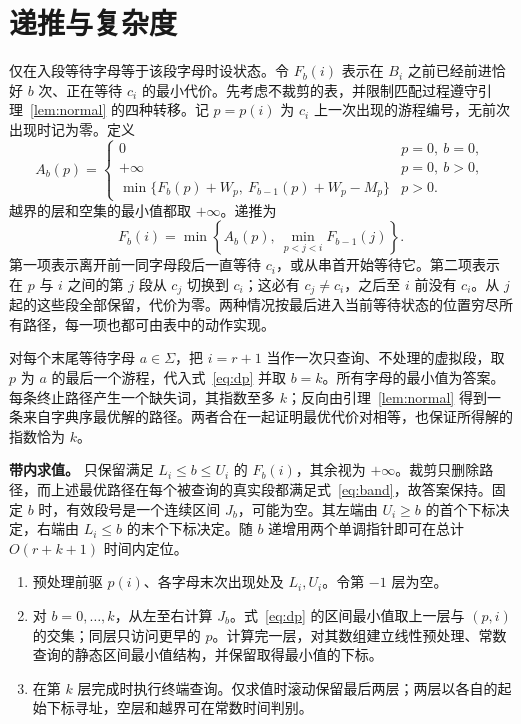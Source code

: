 \documentclass[UTF8,11pt,a4paper,fontset=fandol]{ctexart}
\theoremstyle{zh}
\newcommand{\sig}{\Sigma}
\newcommand{\pagehead}[1]{\clearpage\section{#1}}
\begin{document}
\pagehead{递推与复杂度}
仅在入段等待字母等于该段字母时设状态。令 $F_b(i)$ 表示在 $B_i$ 之前已经前进恰好 $b$ 次、正在等待 $c_i$ 的最小代价。先考虑不裁剪的表，并限制匹配过程遵守引理~\ref{lem:normal} 的四种转移。记 $p=p(i)$ 为 $c_i$ 上一次出现的游程编号，无前次出现时记为零。定义
\[
 A_b(p)=
 \begin{cases}
  0 & p=0,\ b=0,\\
  +\infty & p=0,\ b>0,\\
  \min\{F_b(p)+W_p,\ F_{b-1}(p)+W_p-M_p\} & p>0 .
 \end{cases}
\]
越界的层和空集的最小值都取 $+\infty$。递推为
\begin{equation}
 F_b(i)=\min\left\{ A_b(p),\ \min_{p<j<i}F_{b-1}(j)\right\}.
 \label{eq:dp}
\end{equation}
第一项表示离开前一同字母段后一直等待 $c_i$，或从串首开始等待它。第二项表示在 $p$ 与 $i$ 之间的第 $j$ 段从 $c_j$ 切换到 $c_i$；这必有 $c_j\ne c_i$，之后至 $i$ 前没有 $c_i$。从 $j$ 起的这些段全部保留，代价为零。两种情况按最后进入当前等待状态的位置穷尽所有路径，每一项也都可由表中的动作实现。

对每个末尾等待字母 $a\in\sig$，把 $i=r+1$ 当作一次只查询、不处理的虚拟段，取 $p$ 为 $a$ 的最后一个游程，代入式~\eqref{eq:dp} 并取 $b=k$。所有字母的最小值为答案。每条终止路径产生一个缺失词，其指数至多 $k$；反向由引理~\ref{lem:normal} 得到一条来自字典序最优解的路径。两者合在一起证明最优代价对相等，也保证所得解的指数恰为 $k$。

\noindent\textbf{带内求值。}
只保留满足 $L_i\le b\le U_i$ 的 $F_b(i)$，其余视为 $+\infty$。裁剪只删除路径，而上述最优路径在每个被查询的真实段都满足式~\eqref{eq:band}，故答案保持。固定 $b$ 时，有效段号是一个连续区间 $J_b$，可能为空。其左端由 $U_i\ge b$ 的首个下标决定，右端由 $L_i\le b$ 的末个下标决定。随 $b$ 递增用两个单调指针即可在总计 $O(r+k+1)$ 时间内定位。

\begin{enumerate}[label=\arabic*.]
\item 预处理前驱 $p(i)$、各字母末次出现处及 $L_i,U_i$。令第 $-1$ 层为空。
\item 对 $b=0,\ldots,k$，从左至右计算 $J_b$。式~\eqref{eq:dp} 的区间最小值取上一层与 $(p,i)$ 的交集；同层只访问更早的 $p$。计算完一层，对其数组建立线性预处理、常数查询的静态区间最小值结构\cite{rmq}，并保留取得最小值的下标。
\item 在第 $k$ 层完成时执行终端查询。仅求值时滚动保留最后两层；两层以各自的起始下标寻址，空层和越界可在常数时间判别。
\end{enumerate}
\end{document}
